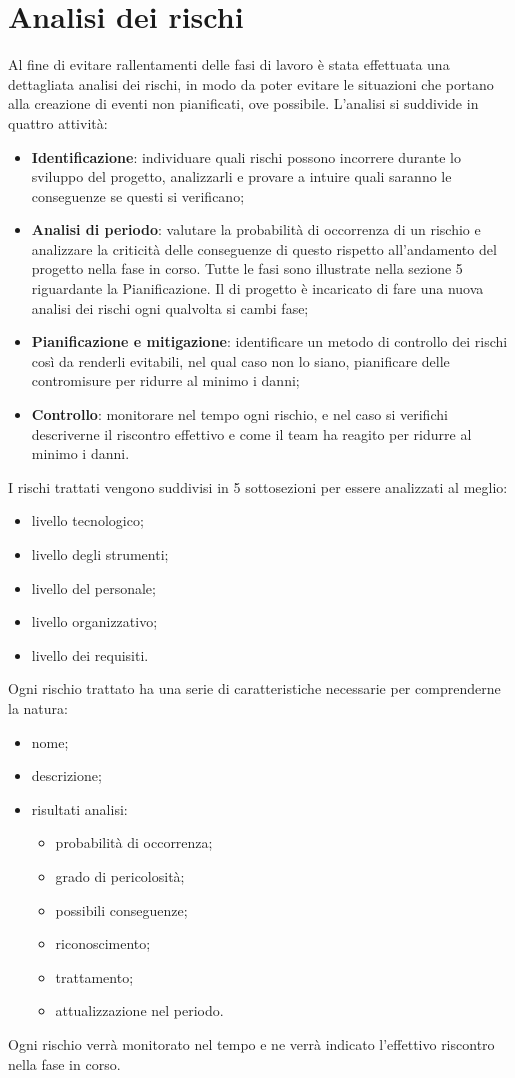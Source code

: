 \documentclass[PianoDiProgetto.tex]{subfiles}
\begin{document}
\section{Analisi dei rischi}
Al fine di evitare rallentamenti delle fasi di lavoro è stata effettuata una dettagliata analisi dei rischi, in modo da poter evitare le situazioni che portano alla creazione di eventi non pianificati, ove possibile. L'analisi si suddivide in quattro attività:
	\begin{itemize}
		\item \textbf{Identificazione}: individuare quali rischi possono incorrere durante lo sviluppo del progetto, analizzarli e provare a intuire quali saranno le conseguenze se questi si verificano;
		\item \textbf{Analisi di periodo}: valutare la probabilità di occorrenza di un rischio e analizzare la criticità delle conseguenze di questo rispetto all'andamento del progetto nella fase in corso. Tutte le fasi sono illustrate nella sezione 5 riguardante la Pianificazione. Il \RESP{} di progetto è incaricato  di fare una nuova analisi dei rischi ogni qualvolta si cambi fase;
		\item \textbf{Pianificazione e mitigazione}: identificare un metodo di controllo dei rischi così da renderli evitabili, nel qual caso non lo siano, pianificare delle contromisure per ridurre al minimo i danni;
		\item \textbf{Controllo}: monitorare nel tempo ogni rischio, e nel caso si verifichi descriverne il riscontro effettivo e come il team ha reagito per ridurre al minimo i danni.
	\end{itemize}
I rischi trattati vengono suddivisi in 5 sottosezioni per essere analizzati al meglio:
	\begin{itemize}
		\item livello tecnologico;
		\item livello degli strumenti;
		\item livello del personale;
		\item livello organizzativo;
		\item livello dei requisiti.
	\end{itemize}
Ogni rischio trattato ha una serie di caratteristiche necessarie per comprenderne la natura:
	\begin{itemize}
		\item nome;
		\item descrizione;
		\item risultati analisi:
			\begin{itemize}
				\item probabilità di occorrenza;
				\item grado di pericolosità;
				\item possibili conseguenze;
				\item riconoscimento;
				\item trattamento;
				\item attualizzazione nel periodo.
			\end{itemize}
	\end{itemize}
Ogni rischio verrà monitorato nel tempo e ne verrà indicato l'effettivo riscontro nella fase in corso.
\end{document}

